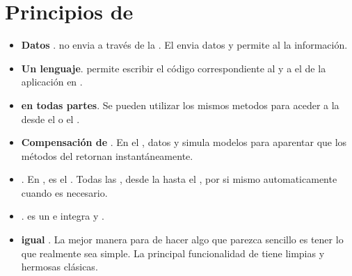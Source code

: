 \section{Principios de \meteor}
\begin{itemize}
	\item \textbf{Datos \onthewire}. \meteor no envia \html a través de la \network. El \server envia datos y permite al \client \render la información.

	\item \textbf{Un lenguaje}. \meteor permite escribir el código correspondiente al \client y a el \server de la aplicación en \javascript.
	\item \textbf{\database en todas partes}. Se pueden utilizar los mismos metodos para aceder a la \database desde el \client o el \server.

	\item \textbf{Compensación de \latency}. En el \client, \meteor \prefetches datos y simula modelos para aparentar que los métodos del \server retornan instantáneamente.

	\item \textbf{\fullstack \reactivity}. En \meteor, \realtime es el . Todas las \layers, desde la \database hasta el \template, \update por si mismo automaticamente cuando es necesario.

	\item \textbf{\embraceecosystem}. \meteor es un \opensource e integra \tools y \frameworks \opensource.

	\item \textbf{\simplicity igual \productivity}. La mejor manera para de hacer algo que parezca sencillo es tener lo que realmente sea simple. La principal funcionalidad de \meteor tiene limpias y hermosas \apis clásicas.

\end{itemize}

